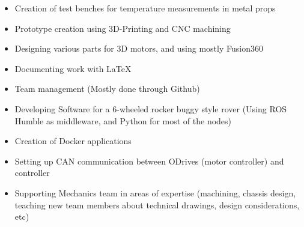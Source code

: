 \documentclass[10pt,a4paper,ragged2e,withhyper]{altacv}
\begin{document}
\begin{paracol}{2}
\newpage


\begin{itemize}
\item Creation of test benches for temperature measurements in metal props
\item Prototype creation using 3D-Printing and CNC machining
\item Designing various parts for 3D motors, and using mostly Fusion360
\item Documenting work with LaTeX 
\end{itemize}

\divider

\begin{itemize}
  \item Team management (Mostly done through Github)
  \item Developing Software for a 6-wheeled rocker buggy style rover (Using ROS Humble as middleware, and Python for most of the nodes)
  \item Creation of Docker applications
  \item Setting up CAN communication between ODrives (motor controller) and controller
  \item Supporting Mechanics team in areas of expertise (machining, chassis design, teaching new team members about technical drawings, design considerations, etc)
\end{itemize}

\bigskip


\hspace*{-1em}  %

\newpage


\end{paracol}
\end{document}
